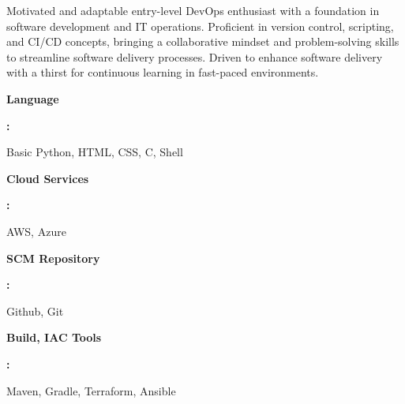 \documentclass[9pt]{developercv} %
\begin{document}
\begin{minipage}[t]{0.46\textwidth}
	\vspace{-6pt}
 
    Motivated and adaptable entry-level DevOps enthusiast with a foundation in software development and IT operations. Proficient in version control, scripting, and CI/CD concepts, bringing a collaborative mindset and problem-solving skills to streamline software delivery processes. Driven to enhance software delivery with a thirst for continuous learning in fast-paced environments.
\end{minipage}
\hfill %
\begin{minipage}[t]{0.465\textwidth}
    \vspace{-6pt}
    
    \begin{minipage}[t]{0.3\textwidth}
        \textbf{Language}
    \end{minipage}
    \begin{minipage}[t]{0.1\textwidth}
        \textbf{:}
    \end{minipage}
    \hfill
    \begin{minipage}[t]{0.73\textwidth}
      Basic Python, HTML, CSS, C, Shell  
    \end{minipage}
    
    \begin{minipage}[t]{0.3\textwidth}
        \textbf{Cloud Services}       
    \end{minipage}
    \begin{minipage}[t]{0.1\textwidth}
        \textbf{:}
    \end{minipage}
    \hfill
    \begin{minipage}[t]{0.73\textwidth}
      AWS, Azure
    \end{minipage}

    \begin{minipage}[t]{0.3\textwidth}
        \textbf{SCM Repository }
    \end{minipage}
    \begin{minipage}[t]{0.1\textwidth}
        \textbf{:}
    \end{minipage}
    \hfill
    \begin{minipage}[t]{0.73\textwidth}
      Github, Git
    \end{minipage}


    \begin{minipage}[t]{0.3\textwidth}
        \textbf{Build, IAC Tools}
    \end{minipage}
    \begin{minipage}[t]{0.1\textwidth}
        \textbf{:}
    \end{minipage}
    \hfill
    \begin{minipage}[t]{0.73\textwidth}
      Maven, Gradle, Terraform, Ansible
    \end{minipage}
    

\end{minipage}
\end{document}
